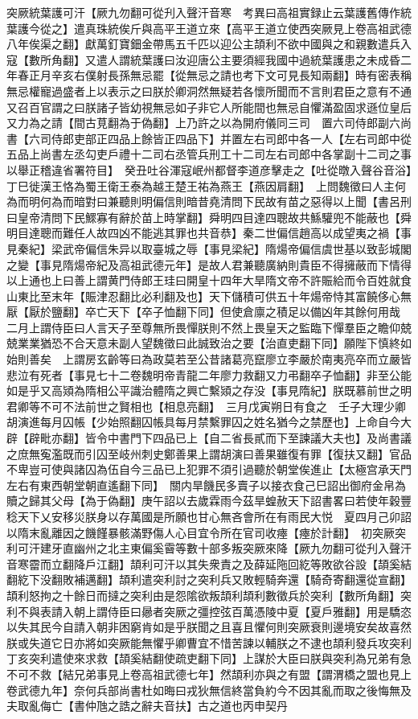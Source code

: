 突厥統葉護可汗【厥九勿翻可從刋入聲汗音寒　考異曰高祖實録止云葉護舊傳作統葉護今從之】遣真珠統俟斤與高平王道立來【高平王道立使西突厥見上卷高祖武德八年俟渠之翻】獻萬釘寶鈿金帶馬五千匹以迎公主頡利不欲中國與之和親數遣兵入寇【數所角翻】又遣人謂統葉護曰汝迎唐公主要須經我國中過統葉護患之未成昏二年春正月辛亥右僕射長孫無忌罷【從無忌之請也考下文可見長知兩翻】時有密表稱無忌權寵過盛者上以表示之曰朕於卿洞然無疑若各懷所聞而不言則君臣之意有不通又召百官謂之曰朕諸子皆幼視無忌如子非它人所能間也無忌自懼滿盈固求遜位皇后又力為之請【間古莧翻為于偽翻】上乃許之以為開府儀同三司　置六司侍郎副六尚書【六司侍郎吏部正四品上餘皆正四品下】并置左右司郎中各一人【左右司郎中從五品上尚書左丞勾吏戶禮十二司右丞管兵刑工十二司左右司郎中各掌副十二司之事以舉正稽違省署符目】　癸丑吐谷渾寇岷州都督李道彦擊走之【吐從暾入聲谷音浴】　丁巳徙漢王恪為蜀王衛王泰為越王楚王祐為燕王【燕因肩翻】　上問魏徵曰人主何為而明何為而暗對曰兼聽則明偏信則暗昔堯清問下民故有苗之惡得以上聞【書呂刑曰皇帝清問下民鰥寡有辭於苗上時掌翻】舜明四目達四聰故共鯀驩兜不能蔽也【舜明目達聰而難任人故四凶不能逃其罪也共音恭】秦二世偏信趙高以成望夷之禍【事見秦紀】梁武帝偏信朱异以取臺城之辱【事見梁紀】隋煬帝偏信虞世基以致彭城閣之變【事見隋煬帝紀及高祖武德元年】是故人君兼聽廣納則貴臣不得擁蔽而下情得以上通也上曰善上謂黄門侍郎王珪曰開皇十四年大旱隋文帝不許賑給而令百姓就食山東比至末年【賑津忍翻比必利翻及也】天下儲積可供五十年煬帝恃其富饒侈心無厭【厭於鹽翻】卒亡天下【卒子恤翻下同】但使倉廪之積足以備凶年其餘何用哉　二月上謂侍臣曰人言天子至尊無所畏憚朕則不然上畏皇天之監臨下憚羣臣之瞻仰兢兢業業猶恐不合天意未副人望魏徵曰此誠致治之要【治直吏翻下同】願陛下慎終如始則善矣　上謂房玄齡等曰為政莫若至公昔諸葛亮竄廖立李嚴於南夷亮卒而立嚴皆悲泣有死者【事見七十二卷魏明帝青龍二年廖力救翻又力弔翻卒子恤翻】非至公能如是乎又高熲為隋相公平識治體隋之興亡繫熲之存没【事見隋紀】朕既慕前世之明君卿等不可不法前世之賢相也【相息亮翻】　三月戊寅朔日有食之　壬子大理少卿胡演進每月囚帳【少始照翻囚帳具每月禁繫罪囚之姓名猶今之禁歷也】上命自今大辟【辟毗亦翻】皆令中書門下四品已上【自二省長貳而下至諫議大夫也】及尚書議之庶無寃濫既而引囚至岐州刺史鄭善果上謂胡演曰善果雖復有罪【復扶又翻】官品不卑豈可使與諸囚為伍自今三品已上犯罪不須引過聽於朝堂俟進止【太極宫承天門左右有東西朝堂朝直遙翻下同】　關内旱饑民多賣子以接衣食己巳詔出御府金帛為贖之歸其父母【為于偽翻】庚午詔以去歲霖雨今茲旱蝗赦天下詔書畧曰若使年穀豐稔天下乂安移災朕身以存萬國是所願也甘心無吝會所在有雨民大悦　夏四月己卯詔以隋末亂離因之饑饉暴骸滿野傷人心目宜令所在官司收瘞【瘞於計翻】　初突厥突利可汗建牙直幽州之北主東偏奚霫等數十部多叛突厥來降【厥九勿翻可從刋入聲汗音寒霤而立翻降戶江翻】頡利可汗以其失衆責之及薛延陁回紇等敗欲谷設【頡奚結翻紇下没翻敗補邁翻】頡利遣突利討之突利兵又敗輕騎奔還【騎奇寄翻還從宣翻】頡利怒拘之十餘日而撻之突利由是怨隂欲叛頡利頡利數徵兵於突利【數所角翻】突利不與表請入朝上謂侍臣曰曏者突厥之彊控弦百萬憑陵中夏【夏戶雅翻】用是驕恣以失其民今自請入朝非困窮肯如是乎朕聞之且喜且懼何則突厥衰則邊境安矣故喜然朕或失道它日亦將如突厥能無懼乎卿曹宜不惜苦諫以輔朕之不逮也頡利發兵攻突利丁亥突利遣使來求救【頡奚結翻使疏吏翻下同】上謀於大臣曰朕與突利為兄弟有急不可不救【結兄弟事見上卷高祖武德七年】然頡利亦與之有盟【謂渭橋之盟也見上卷武德九年】奈何兵部尚書杜如晦曰戎狄無信終當負約今不因其亂而取之後悔無及夫取亂侮亡【書仲虺之誥之辭夫音扶】古之道也丙申契丹